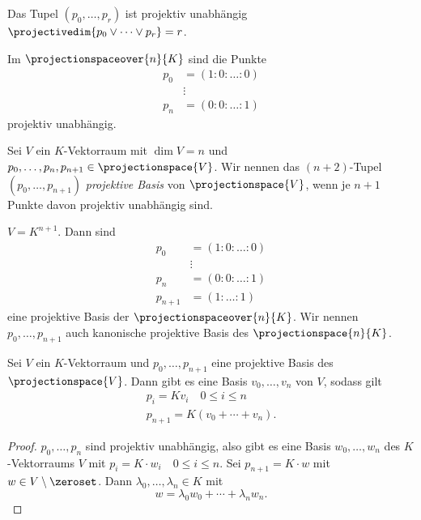 \begin{bemerkungen*}
  Das Tupel \( (p_0,\dotsc,p_r) \) ist projektiv unabhängig \gdw \( \projectivedim{p_0\vee \dotsb\vee p_r}=r \).
\end{bemerkungen*}
\begin{beispiel*}
  Im \( \projectionspaceover{n}{K} \) sind die Punkte
  \begin{align*}
    p_0&=(1:0:\dotsc:0)\\
    &\vdots\\
    p_n&=(0:0:\dotsc:1)
  \end{align*}
  projektiv unabhängig.
\end{beispiel*}
\begin{definition*}
  Sei \( V \) ein \( K \)-Vektorraum mit \( \dim V=n \) und \( p_0,\dotsc,p_n,p_{n+1}\in \projectionspace{V} \). Wir nennen das \( (n+2) \)-Tupel \( (p_0,\dotsc,p_{n+1}) \) \emph{projektive Basis} von \( \projectionspace{V} \), wenn je \( n+1 \) Punkte davon projektiv unabhängig sind.
\end{definition*}
\begin{beispiel*}
  \( V=K^{n+1} \). Dann sind
  \begin{align*}
    p_0&=(1:0:\dotsc:0)\\
    &\vdots\\
    p_n&=(0:0:\dotsc:1)\\
    p_{n+1}&=(1:\dotsc:1)
  \end{align*}
  eine projektive Basis der \( \projectionspaceover{n}{K} \). Wir nennen \( p_0,\dotsc,p_{n+1}  \) auch kanonische projektive Basis des \( \projectionspace{n}{K} \).
\end{beispiel*}
\begin{lemma}\label{kanonische_projektive_basis_klappt}
  Sei \( V \) ein \( K \)-Vektorraum und \( p_0,\dotsc,p_{n+1} \) eine projektive Basis des \( \projectionspace{V} \). Dann gibt es eine Basis \( v_0,\dots,v_n \) von \( V \), sodass gilt
  \begin{gather*}
    p_i=Kv_i\quad 0\leq i\leq n\\
    p_{n+1}=K(v_0+\dotsb+v_n).
  \end{gather*}
\end{lemma}
\begin{proof}
  \( p_0,\dotsc,p_n \) sind projektiv unabhängig, also gibt es eine Basis \( w_0,\dotsc,w_n \) des \( K \)-Vektorraums \( V \) mit \( p_i=K\cdot w_i \quad 0\leq i\leq n\). Sei \( p_{n+1}=K\cdot w \) mit \( w\in V\setminus\zeroset \). Dann \texists \( \lambda_0,\dotsc,\lambda_n\in K \) mit 
  \begin{equation*}
    w=\lambda_0 w_0+\dotsb+\lambda_n w_n.
  \end{equation*}
\end{proof}
